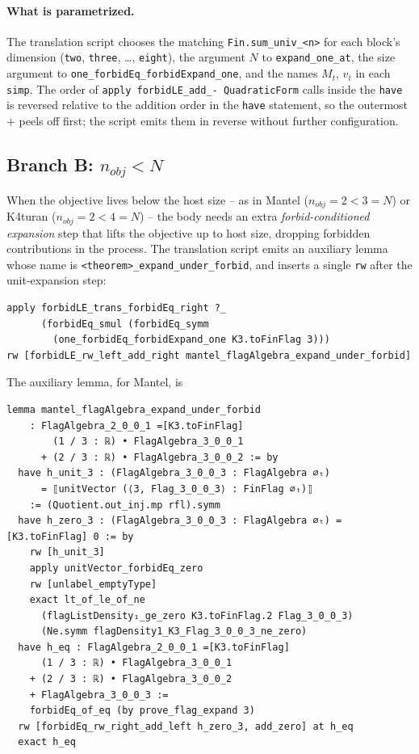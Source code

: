 \documentclass[11pt]{article}
\begin{document}
\paragraph{What is parametrized.}
The translation script chooses the matching
\texttt{Fin.sum\_univ\_<n>} for each block's dimension (\texttt{two},
\texttt{three}, \ldots, \texttt{eight}), the argument $N$ to
\texttt{expand\_one\_at}, the size argument to
\texttt{one\_forbidEq\_forbidExpand\_one}, and the names $M_t$, $v_t$ in
each \texttt{simp}. The order of \texttt{apply forbidLE\_add\_-
QuadraticForm} calls inside the \texttt{have} is reversed relative to
the addition order in the \texttt{have} statement, so the outermost
$+$ peels off first; the script emits them in reverse without further
configuration.

\subsection{Branch B: $n_{\mathit{obj}} < N$}

When the objective lives below the host size -- as in Mantel
($n_{\mathit{obj}} = 2 < 3 = N$) or K4turan
($n_{\mathit{obj}} = 2 < 4 = N$) -- the body needs an extra
\emph{forbid-conditioned expansion} step that lifts the objective up to
host size, dropping forbidden contributions in the process. The
translation script emits an auxiliary lemma whose name is
\texttt{<theorem>\_expand\_under\_forbid}, and inserts a single
\texttt{rw} after the unit-expansion step:
\begin{lstlisting}
apply forbidLE_trans_forbidEq_right ?_
      (forbidEq_smul (forbidEq_symm
        (one_forbidEq_forbidExpand_one K3.toFinFlag 3)))
rw [forbidLE_rw_left_add_right mantel_flagAlgebra_expand_under_forbid]
\end{lstlisting}
The auxiliary lemma, for Mantel, is

\begin{lstlisting}
lemma mantel_flagAlgebra_expand_under_forbid
    : FlagAlgebra_2_0_0_1 =[K3.toFinFlag]
        (1 / 3 : ℝ) • FlagAlgebra_3_0_0_1
      + (2 / 3 : ℝ) • FlagAlgebra_3_0_0_2 := by
  have h_unit_3 : (FlagAlgebra_3_0_0_3 : FlagAlgebra ∅ₜ)
      = ⟦unitVector (⟨3, Flag_3_0_0_3⟩ : FinFlag ∅ₜ)⟧
    := (Quotient.out_inj.mp rfl).symm
  have h_zero_3 : (FlagAlgebra_3_0_0_3 : FlagAlgebra ∅ₜ) =[K3.toFinFlag] 0 := by
    rw [h_unit_3]
    apply unitVector_forbidEq_zero
    rw [unlabel_emptyType]
    exact lt_of_le_of_ne
      (flagListDensity₁_ge_zero K3.toFinFlag.2 Flag_3_0_0_3)
      (Ne.symm flagDensity1_K3_Flag_3_0_0_3_ne_zero)
  have h_eq : FlagAlgebra_2_0_0_1 =[K3.toFinFlag]
      (1 / 3 : ℝ) • FlagAlgebra_3_0_0_1
    + (2 / 3 : ℝ) • FlagAlgebra_3_0_0_2
    + FlagAlgebra_3_0_0_3 :=
    forbidEq_of_eq (by prove_flag_expand 3)
  rw [forbidEq_rw_right_add_left h_zero_3, add_zero] at h_eq
  exact h_eq
\end{lstlisting}
\end{document}
